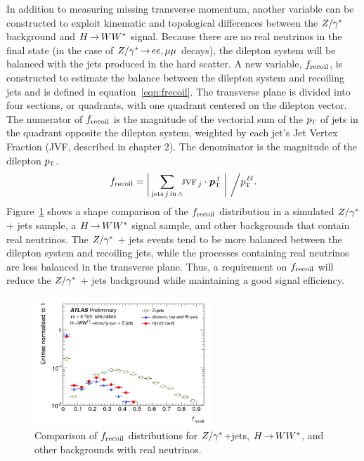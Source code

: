 In addition to measuring missing transverse momentum, another variable can be constructed to exploit kinematic and topological differences between the $Z/\gamma^{\ast}$ background and $H{\,{\rightarrow}\,}WW^\ast$ signal. Because there are no real neutrinos in the final state (in the case of $Z/\gamma^{*} \,{\rightarrow}\, ee,\mu\mu$ decays), the dilepton system will be balanced with the jets produced in the hard scatter. A new variable, $f_{\rm recoil}$, is constructed to estimate the balance between the dilepton system and recoiling jets and is defined in equation~\ref{eqn:frecoil}. The transverse plane is divided into four sections, or quadrants, with one quadrant centered on the dilepton vector. The numerator of $f_{\rm recoil}$ is the magnitude of the vectorial sum of the $p_{\textrm{\footnotesize\sc t}}$ of jets in the quadrant opposite the dilepton system, weighted by each jet's Jet Vertex Fraction (JVF, described in chapter 2). The denominator is the magnitude of the dilepton $p_{\textrm{\footnotesize\sc t}}$. 
%
\begin{equation}
\frecoil = \raisebox{-3pt}{\bigg|} \sum_{{\rm jets\,}j{\rm\,in\,}\wedge}
           \no\jvf_{\,j}\cdot\vpTjet
           ~\raisebox{-3pt}{\bigg|}
           ~\raisebox{-3pt}{\bigg/} \pTll.
\label{eqn:frecoil}
\end{equation}
%
Figure~\ref{fig:frecoil} shows a shape comparison of the $f_{\rm recoil}$ distribution in a simulated $Z/\gamma^{\ast}$ + jets sample, a $H{\,{\rightarrow}\,}WW^\ast$ signal sample, and other backgrounds that contain real neutrinos. The $Z/\gamma^{\ast}$ + jets events tend to be more balanced between the dilepton system and recoiling jets, while the processes containing real neutrinos are less balanced in the transverse plane. Thus, a requirement on $f_{\rm recoil}$ will reduce the $Z/\gamma^{\ast}$ + jets background while maintaining a good signal efficiency. 

\begin{figure}[h!]
  \centering
  \captionsetup{justification=centering}

  \includegraphics[width=0.6\textwidth]{figures/frecoil}
  \caption{Comparison of $f_{\rm recoil}$ distributions for $Z/\gamma^{\ast}$+jets, $H{\,{\rightarrow}\,}WW^\ast$, and other backgrounds with real neutrinos.}
  \label{fig:frecoil}
\end{figure}

